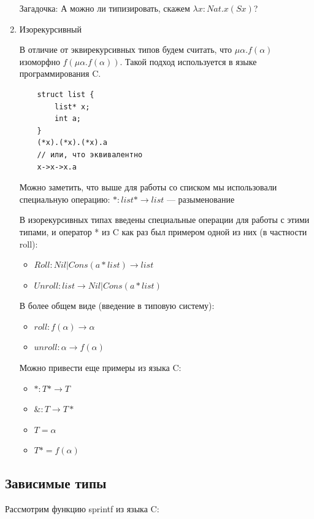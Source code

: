 \begin{enumerate}
    Загадочка: А можно ли типизировать, скажем $\lambda x : Nat. x (S x)$?
    \item Изорекурсивный
    
    В отличие от эквирекурсивных типов будем считать, что $\mu \alpha. f(\alpha)$ изоморфно $f(\mu \alpha.f(\alpha))$. Такой подход используется в языке программирования C.
    \begin{verbatim}
    struct list {
        list* x;
        int a;
    }
    (*x).(*x).(*x).a
    // или, что эквивалентно
    x->x->x.a
    \end{verbatim}
    
    Можно заметить, что выше для работы со списком мы использовали специальную операцию:
    $*: list* \rightarrow list$ --- разыменование 
    
    В изорекурсивных типах введены специальные операции для работы с этими типами, и оператор * из C как раз был примером одной из них (в частности roll):
    \begin{itemize}
        \item $Roll: Nil | Cons (a * list) \rightarrow list$
        \item $Unroll: list \rightarrow Nil | Cons (a * list)$
    \end{itemize}
    
    В более общем виде (введение в типовую систему): 
    \begin{itemize}
        \item $roll: f(\alpha) \rightarrow \alpha$
        \item $unroll: \alpha \rightarrow f(\alpha)$
    \end{itemize}
    
    Можно привести еще примеры из языка C:
    \begin{itemize}
        \item $*: T* \rightarrow T$
        \item $\&: T \rightarrow T*$
        \item $T = \alpha$
        \item $T* = f(\alpha)$
    \end{itemize}
    
\end{enumerate}

\subsection{Зависимые типы}
    
Рассмотрим функцию sprintf из языка C:
    
